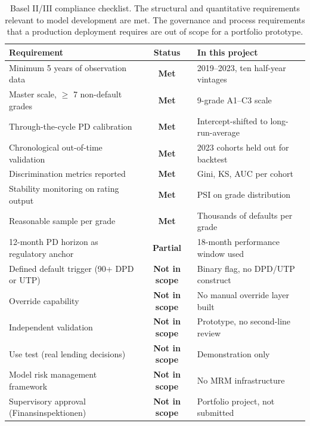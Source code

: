 \documentclass[a4paper,11pt]{article}
\begin{document}
\begin{table}[H]
\centering
\footnotesize
\begin{tabular}{l c l}
\toprule
\textbf{Requirement} & \textbf{Status} & \textbf{In this project} \\
\midrule
Minimum 5 years of observation data & \textcolor{goodgreen}{\textbf{Met}} & 2019--2023, ten half-year vintages \\
Master scale, $\geq$ 7 non-default grades & \textcolor{goodgreen}{\textbf{Met}} & 9-grade A1--C3 scale \\
Through-the-cycle PD calibration & \textcolor{goodgreen}{\textbf{Met}} & Intercept-shifted to long-run-average \\
Chronological out-of-time validation & \textcolor{goodgreen}{\textbf{Met}} & 2023 cohorts held out for backtest \\
Discrimination metrics reported & \textcolor{goodgreen}{\textbf{Met}} & Gini, KS, AUC per cohort \\
Stability monitoring on rating output & \textcolor{goodgreen}{\textbf{Met}} & PSI on grade distribution \\
Reasonable sample per grade & \textcolor{goodgreen}{\textbf{Met}} & Thousands of defaults per grade \\
\midrule
12-month PD horizon as regulatory anchor & \textcolor{missingred}{\textbf{Partial}} & 18-month performance window used \\
\midrule
Defined default trigger (90+ DPD or UTP) & \textcolor{missingred}{\textbf{Not in scope}} & Binary flag, no DPD/UTP construct \\
Override capability & \textcolor{missingred}{\textbf{Not in scope}} & No manual override layer built \\
Independent validation & \textcolor{missingred}{\textbf{Not in scope}} & Prototype, no second-line review \\
Use test (real lending decisions) & \textcolor{missingred}{\textbf{Not in scope}} & Demonstration only \\
Model risk management framework & \textcolor{missingred}{\textbf{Not in scope}} & No MRM infrastructure \\
Supervisory approval (Finansinspektionen) & \textcolor{missingred}{\textbf{Not in scope}} & Portfolio project, not submitted \\
\bottomrule
\end{tabular}
\caption{Basel II/III compliance checklist. The structural and quantitative requirements relevant to model development are met. The governance and process requirements that a production deployment requires are out of scope for a portfolio prototype.}
\end{table}
\end{document}
